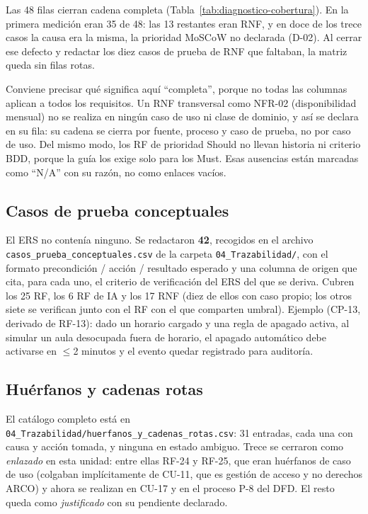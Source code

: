 Las 48 filas cierran cadena completa (Tabla~\ref{tab:diagnostico-cobertura}). En la primera medici\'on eran 35 de 48: las 13 restantes eran RNF, y en doce de los trece casos la causa era la misma, la prioridad MoSCoW no declarada (D-02). Al cerrar ese defecto y redactar los diez casos de prueba de RNF que faltaban, la matriz queda sin filas rotas.

Conviene precisar qu\'e significa aqu\'i ``completa'', porque no todas las columnas aplican a todos los requisitos. Un RNF transversal como NFR-02 (disponibilidad mensual) no se realiza en ning\'un caso de uso ni clase de dominio, y as\'i se declara en su fila: su cadena se cierra por fuente, proceso y caso de prueba, no por caso de uso. Del mismo modo, los RF de prioridad Should no llevan historia ni criterio BDD, porque la gu\'ia los exige solo para los Must. Esas ausencias est\'an marcadas como ``N/A'' con su raz\'on, no como enlaces vac\'ios.

\subsection{Casos de prueba conceptuales}

El ERS no conten\'ia ninguno. Se redactaron \textbf{42}, recogidos en el archivo \texttt{casos\_prueba\_\allowbreak conceptuales.csv} de la carpeta \texttt{04\_Trazabilidad/}, con el formato precondici\'on / acci\'on / resultado esperado y una columna de origen que cita, para cada uno, el criterio de verificaci\'on del ERS del que se deriva. Cubren los 25 RF, los 6 RF de IA y los 17 RNF (diez de ellos con caso propio; los otros siete se verifican junto con el RF con el que comparten umbral). Ejemplo (CP-13, derivado de RF-13): dado un horario cargado y una regla de apagado activa, al simular un aula desocupada fuera de horario, el apagado autom\'atico debe activarse en $\leq$2 minutos y el evento quedar registrado para auditor\'ia.

\subsection{Hu\'erfanos y cadenas rotas}

El cat\'alogo completo est\'a en \texttt{04\_Trazabilidad/huerfanos\_y\_cadenas\_rotas.csv}: 31 entradas, cada una con causa y acci\'on tomada, y ninguna en estado ambiguo. Trece se cerraron como \emph{enlazado} en esta unidad: entre ellas RF-24 y RF-25, que eran hu\'erfanos de caso de uso (colgaban impl\'icitamente de CU-11, que es gesti\'on de acceso y no derechos ARCO) y ahora se realizan en CU-17 y en el proceso P-8 del DFD. El resto queda como \emph{justificado} con su pendiente declarado.

